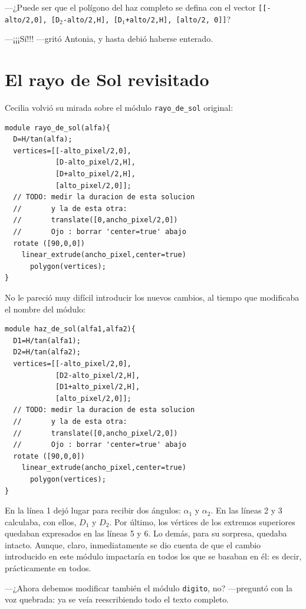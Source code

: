 ---¿Puede ser que el polígono del haz completo se defina con el vector
\texttt{[[-alto/2,0], [D$_2$-alto/2,H], [D$_1$+alto/2,H], [alto/2, 0]]}?

  ---¡¡¡Sí!!! ---gritó Antonia, y hasta \director{} debió haberse
  enterado.

\section{El rayo de Sol revisitado}

Cecilia volvió su mirada sobre el módulo \lstinline!rayo_de_sol!
original:

\begin{lstlisting}
module rayo_de_sol(alfa){
  D=H/tan(alfa);
  vertices=[[-alto_pixel/2,0],
            [D-alto_pixel/2,H],
            [D+alto_pixel/2,H],
            [alto_pixel/2,0]];
  // TODO: medir la duracion de esta solucion
  //       y la de esta otra:
  //       translate([0,ancho_pixel/2,0])
  //       Ojo : borrar 'center=true' abajo
  rotate ([90,0,0])
    linear_extrude(ancho_pixel,center=true)
      polygon(vertices);
}
\end{lstlisting}

No le pareció muy difícil introducir los nuevos cambios, al tiempo que
modificaba el nombre del módulo:

\begin{lstlisting}
module haz_de_sol(alfa1,alfa2){
  D1=H/tan(alfa1);
  D2=H/tan(alfa2);
  vertices=[[-alto_pixel/2,0],
            [D2-alto_pixel/2,H],
            [D1+alto_pixel/2,H],
            [alto_pixel/2,0]];
  // TODO: medir la duracion de esta solucion
  //       y la de esta otra:
  //       translate([0,ancho_pixel/2,0])
  //       Ojo : borrar 'center=true' abajo
  rotate ([90,0,0])
    linear_extrude(ancho_pixel,center=true)
      polygon(vertices);
}
\end{lstlisting}

En la línea 1 dejó lugar para recibir dos ángulos: $\alpha_1$ y
$\alpha_2$. En las líneas 2 y 3 calculaba, con ellos, $D_1$ y
$D_2$. Por último, los vértices de los extremos superiores quedaban
expresados en las líneas 5 y 6. Lo demás, para su sorpresa, quedaba
intacto. Aunque, claro, inmediatamente se dio cuenta de que el cambio
introducido en este módulo impactaría en todos los que se basaban en
él: es decir, prácticamente en todos.

---¿Ahora debemos modificar también el módulo \lstinline!digito!, no?
---preguntó con la voz quebrada: ya se veía reescribiendo todo el
texto completo.

